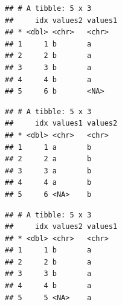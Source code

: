 \documentclass[krantz2]{krantz}\usepackage{knitr}
\begin{document}
\begin{knitrout}\footnotesize
{}\color{fgcolor}\begin{kframe}
\begin{alltt}
\hlstd{(}   
\end{alltt}


{\ttfamily\noindent\itshape{}}\begin{verbatim}
## # A tibble: 5 x 3
##     idx values2 values1
## * <dbl> <chr>   <chr>
## 1     1 b       a
## 2     2 b       a
## 3     3 b       a
## 4     4 b       a
## 5     6 b       <NA>
\end{verbatim}
\end{kframe}
\end{knitrout}

\begin{knitrout}\footnotesize
{}\color{fgcolor}\begin{kframe}
\begin{alltt}
\hlstd{(}   
\end{alltt}


{\ttfamily\noindent\itshape{}}\begin{verbatim}
## # A tibble: 5 x 3
##     idx values1 values2
## * <dbl> <chr>   <chr>
## 1     1 a       b
## 2     2 a       b
## 3     3 a       b
## 4     4 a       b
## 5     6 <NA>    b
\end{verbatim}
\end{kframe}
\end{knitrout}

\begin{knitrout}\footnotesize
{}\color{fgcolor}\begin{kframe}
\begin{alltt}
\hlstd{(}   
\end{alltt}


{\ttfamily\noindent\itshape{}}\begin{verbatim}
## # A tibble: 5 x 3
##     idx values2 values1
## * <dbl> <chr>   <chr>
## 1     1 b       a
## 2     2 b       a
## 3     3 b       a
## 4     4 b       a
## 5     5 <NA>    a
\end{verbatim}
\end{kframe}
\end{knitrout}
\end{document}
